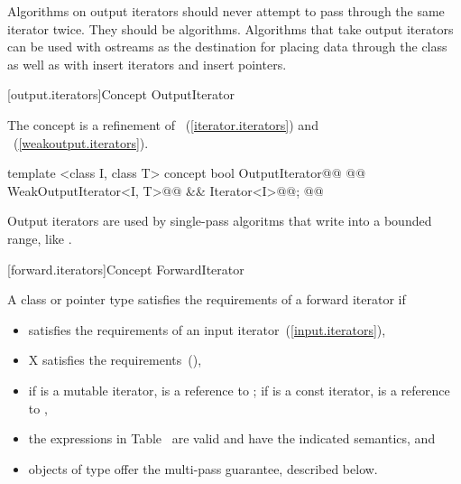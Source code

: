 \pnum
\enternote
{}
\textit{}
Algorithms on output iterators should never attempt to pass through the same iterator twice.
They should be
algorithms.
Algorithms that take output iterators can be used with ostreams as the destination
for placing data through the
class as well as with insert iterators and insert pointers.
\exitnote

\begin{addedblock}
[output.iterators]{Concept OutputIterator}

\pnum
The  concept is a refinement of ~(\ref{iterator.iterators}) and
~(\ref{weakoutput.iterators}).

%
\begin{codeblock}
  template <class I, class T>
  concept bool OutputIterator@\newtxt{() \{}\oldtxt{ =}@
    @@ WeakOutputIterator<I, T>@\newtxt{()}@ && Iterator<I>@\newtxt{()}@;
  @\newtxt{\}}@
\end{codeblock}

\pnum
\enternote Output iterators are used by single-pass
algoritms that write into a bounded range, like .
\exitnote

\end{addedblock}

[forward.iterators]{Concept ForwardIterator}

\begin{removedblock}
\pnum
A class or pointer type
satisfies the requirements of a forward iterator if

\begin{itemize}
\item {} satisfies the requirements of an input iterator~(\ref{input.iterators}),

\item X satisfies the 
requirements~(),

\item if  is a mutable iterator,  is a reference to ;
if  is a const iterator,  is a reference to ,

\item the expressions in Table~
are valid and have the indicated semantics, and

\item objects of type  offer the multi-pass guarantee, described below.
\end{itemize}
\end{removedblock}

